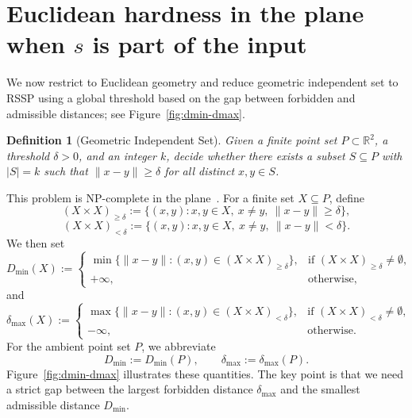 \documentclass[11pt]{article}
\newtheorem{definition}{Definition}
\begin{document}
\section{Euclidean hardness in the plane when \texorpdfstring{$s$}{s} is part of the input}

We now restrict to Euclidean geometry and reduce geometric independent set to
RSSP using a global threshold based on the gap between forbidden and
admissible distances; see Figure~\ref{fig:dmin-dmax}.

\begin{definition}[Geometric Independent Set]
Given a finite point set $P\subset\mathbb{R}^2$, a threshold $\delta>0$, and an integer $k$, decide whether there exists a subset $S\subseteq P$ with $|S|=k$ such that $\|x-y\|\ge \delta$ for all distinct $x,y\in S$.
\end{definition}

This problem is NP-complete in the plane~\cite{ClarkColbournJohnson1990,AgarwalVanKreveldSuri1998,FowlerPatersonTanimoto1981}. For a finite set $X\subseteq P$, define
\[
(X\times X)_{\ge \delta}:=\{(x,y):x,y\in X,\ x\neq y,\ \|x-y\|\ge \delta\},
\]
\[
(X\times X)_{< \delta}:=\{(x,y):x,y\in X,\ x\neq y,\ \|x-y\|< \delta\}.
\]
We then set
\[
D_{\min}(X):=
\begin{cases}
\min\{\|x-y\|:(x,y)\in (X\times X)_{\ge\delta}\}, & \text{if }(X\times X)_{\ge\delta}\neq\emptyset,\\
+\infty, & \text{otherwise,}
\end{cases}
\]
and
\[
\delta_{\max}(X):=
\begin{cases}
\max\{\|x-y\|:(x,y)\in (X\times X)_{<\delta}\}, & \text{if }(X\times X)_{<\delta}\neq\emptyset,\\
-\infty, & \text{otherwise.}
\end{cases}
\]
For the ambient point set $P$, we abbreviate
\[
D_{\min}:=D_{\min}(P),\qquad \delta_{\max}:=\delta_{\max}(P).
\]
Figure~\ref{fig:dmin-dmax} illustrates these quantities. The key point is that
we need a strict gap between the largest forbidden distance $\delta_{\max}$
and the smallest admissible distance $D_{\min}$.
\end{document}
